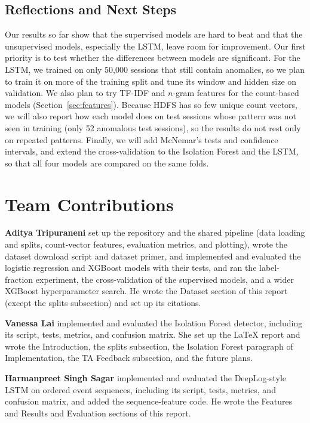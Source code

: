 \documentclass[11pt]{article}
\begin{document}
\subsection{Reflections and Next Steps}
Our results so far show that the supervised models are hard to beat and that the
unsupervised models, especially the LSTM, leave room for improvement. Our first priority is to test whether the differences between models are significant. For the LSTM,
we trained on only 50,000 sessions that still contain anomalies, so we plan to train it on
more of the training split and tune its window and hidden size on validation. We also plan
to try TF-IDF and $n$-gram features for the count-based models
(Section~\ref{sec:features}). Because HDFS has so few unique count vectors, we will also
report how each model does on test sessions whose pattern was not seen in training (only 52
anomalous test sessions), so the results do not rest only on repeated patterns. Finally, we
will add McNemar's tests and confidence intervals, and extend the cross-validation to the
Isolation Forest and the LSTM, so that all four models are compared on the same folds.


\section*{Team Contributions}

\textbf{Aditya Tripuraneni} set up the repository and the shared pipeline (data loading and splits, count-vector features, evaluation metrics, and plotting), wrote the dataset download script and dataset primer, and implemented and evaluated the logistic regression and XGBoost models with their tests, and ran the label-fraction experiment, the cross-validation of the supervised models, and a wider XGBoost hyperparameter search. He wrote the Dataset section of this report (except the splits subsection) and set up its citations.

\textbf{Vanessa Lai} implemented and evaluated the Isolation Forest detector, including its script, tests, metrics, and confusion matrix. She set up the \LaTeX{} report and wrote the Introduction, the splits subsection, the Isolation Forest paragraph of Implementation, the TA Feedback subsection, and the future plans.

\textbf{Harmanpreet Singh Sagar} implemented and evaluated the DeepLog-style LSTM on ordered event sequences, including its script, tests, metrics, and confusion matrix, and added the sequence-feature code. He wrote the Features and Results and Evaluation sections of this report.


\end{document}
